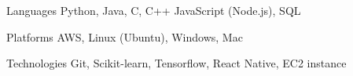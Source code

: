 \begin{cvskills}

\cvskill
    {Languages}
    {Python, Java, C, C++ JavaScript (Node.js), SQL}

\cvskill
    {Platforms}
    {AWS, Linux (Ubuntu), Windows, Mac}

\cvskill
    {Technologies}
    {Git, Scikit-learn, Tensorflow, React Native, EC2 instance}

\end{cvskills}

